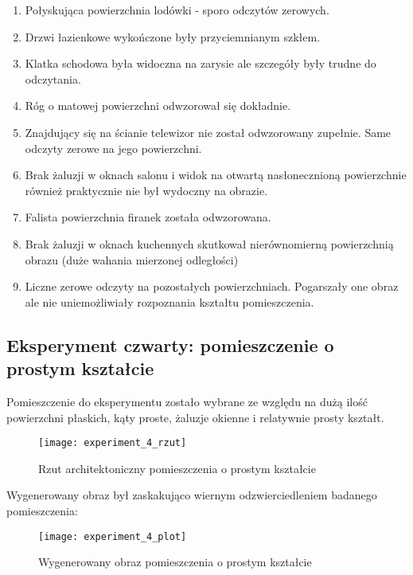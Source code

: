 \begin{enumerate}
    \item Połyskująca powierzchnia lodówki - sporo odczytów zerowych.
    \item Drzwi łazienkowe wykończone były przyciemnianym szkłem.
    \item Klatka schodowa była widoczna na zarysie ale szczegóły były trudne do odczytania.
    \item Róg o matowej powierzchni odwzorował się dokładnie.
    \item Znajdujący się na ścianie telewizor nie został odwzorowany zupełnie. Same odczyty zerowe na jego powierzchni.
    \item Brak żaluzji w oknach salonu i widok na otwartą nasłonecznioną powierzchnie również praktycznie nie był wydoczny na obrazie.
    \item Falista powierzchnia firanek została odwzorowana.
    \item Brak żaluzji w oknach kuchennych skutkował nierównomierną powierzchnią obrazu (duże wahania mierzonej odległości)
    \item Liczne zerowe odczyty na pozostałych powierzchniach. Pogarszały one obraz ale nie uniemożliwiały rozpoznania kształtu pomieszczenia.
\end{enumerate}

\newpage
\subsection {Eksperyment czwarty: pomieszczenie o prostym kształcie}
Pomieszczenie do eksperymentu zostało wybrane ze względu na dużą ilość powierzchni płaskich, kąty proste, żaluzje okienne i relatywnie prosty kształt.\\
\begin{figure}[h]
    \centering
    \texttt{[image: experiment\_4\_rzut]}
    \caption{Rzut architektoniczny pomieszczenia o prostym kształcie}
    \label{fig:experiment_4_rzut}
\end{figure}

Wygenerowany obraz był zaskakująco wiernym odzwierciedleniem badanego pomieszczenia:
\begin{figure}[h]
    \centering
    \texttt{[image: experiment\_4\_plot]}
    \caption{Wygenerowany obraz pomieszczenia o prostym kształcie}
    \label{fig:experiment_4_plot}
\end{figure}

\newpage

